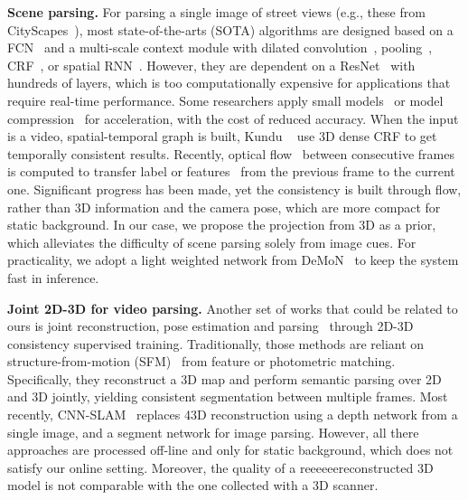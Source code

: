 \textbf{Scene parsing.} For parsing a single image of street views (e.g., these from CityScapes~\cite{Cordts2016Cityscapes}), most state-of-the-arts (SOTA) algorithms are designed based on a FCN~\cite{WuSH16e} and a multi-scale context module with dilated convolution~\cite{ChenPSA17}, pooling~\cite{ZhaoSQWJ16}, CRF~\cite{higherordercrf_ECCV2016}, or spatial RNN~\cite{byeon2015scene}. However, they are dependent on a ResNet~\cite{HeZRS15} with hundreds of layers, which is too computationally expensive for applications that require real-time performance. 
Some researchers apply small models~\cite{PaszkeCKC16} or model compression~\cite{ZhaoQSSJ17} for acceleration, with the cost of reduced accuracy.
When the input is a video, spatial-temporal graph is built, Kundu \etal~\cite{kundu2016feature} use 3D dense CRF to get temporally consistent results. Recently, optical flow~\cite{dosovitskiy2015flownet} between consecutive frames is computed to transfer label or features~\cite{gadde2017semantic,zhu2016deep} from the previous frame to the current one.  Significant progress has been made, yet the consistency is built through flow, rather than 3D information and the camera pose, which are more compact for static background. In our case, we propose the projection from 3D as a prior, which alleviates the difficulty of scene parsing solely from image cues. For practicality, we adopt a light weighted network from DeMoN~\cite{ummenhofer2016demon} to keep the system fast in inference.%

\textbf{Joint 2D-3D for video parsing.} Another set of works that could be related to ours is joint reconstruction, pose estimation and parsing~\cite{kundu2014joint,hane2013joint} through 2D-3D consistency supervised training.
 Traditionally, those methods are reliant on structure-from-motion (SFM)~\cite{hane2013joint} from feature or photometric matching. Specifically, they reconstruct a 3D map and perform semantic parsing over 2D and 3D jointly, yielding consistent segmentation between multiple frames.
 Most recently, CNN-SLAM~\cite{tateno2017cnn} replaces 43D reconstruction using a depth network from a single image, and a segment network for image parsing.
 However, all there approaches are processed off-line and only for static background, which does not satisfy our online setting. Moreover, the quality of a reeeeeereconstructed 3D model is not comparable with the one collected with a 3D scanner. %
